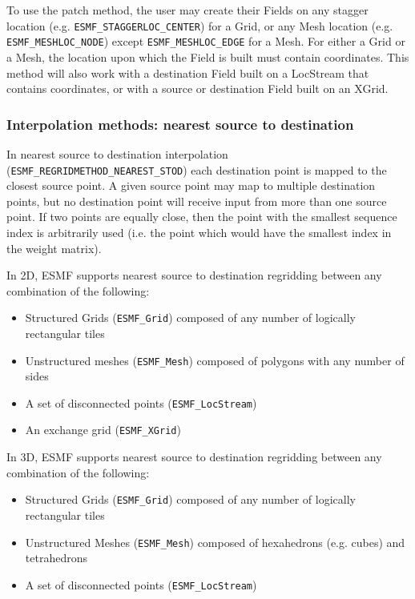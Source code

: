  To use the patch method, the user may create their Fields on any stagger location (e.g. {\tt ESMF\_STAGGERLOC\_CENTER}) for a Grid, or
 any Mesh location (e.g. {\tt ESMF\_MESHLOC\_NODE}) except {\tt ESMF\_MESHLOC\_EDGE} for a Mesh. For either a Grid or a Mesh, the location upon which the Field is built 
 must contain coordinates. This method will also work with a destination Field built on a LocStream that contains coordinates, 
 or with a source or destination Field built on an XGrid.

\subsubsection{Interpolation methods: nearest source to destination}\label{sec:interpolation:neareststod}
In nearest source to destination interpolation ({\tt ESMF\_REGRIDMETHOD\_NEAREST\_STOD}) each destination point is mapped to the closest source point. A given source point may map to multiple destination points, but no destination point will receive input from more than one source point. If two points are equally close, then the point with the smallest sequence index is arbitrarily used (i.e. the point which would have the smallest index in the weight matrix). 

\smallskip

 In 2D, ESMF supports nearest source to destination regridding between any combination of the following:
 \begin{itemize}
 \item Structured Grids ({\tt ESMF\_Grid}) composed of any number of logically rectangular tiles
 \item Unstructured meshes ({\tt ESMF\_Mesh}) composed of polygons with any number of sides
 \item A set of disconnected points ({\tt ESMF\_LocStream}) 
 \item An exchange grid ({\tt ESMF\_XGrid})
 \end{itemize}

\smallskip

 In 3D, ESMF supports nearest source to destination regridding between any combination of the following:
 \begin{itemize}
 \item Structured Grids ({\tt ESMF\_Grid}) composed of any number of logically rectangular tiles
 \item Unstructured Meshes ({\tt ESMF\_Mesh}) composed of hexahedrons (e.g. cubes) and tetrahedrons
 \item A set of disconnected points ({\tt ESMF\_LocStream}) 
 \end{itemize}

